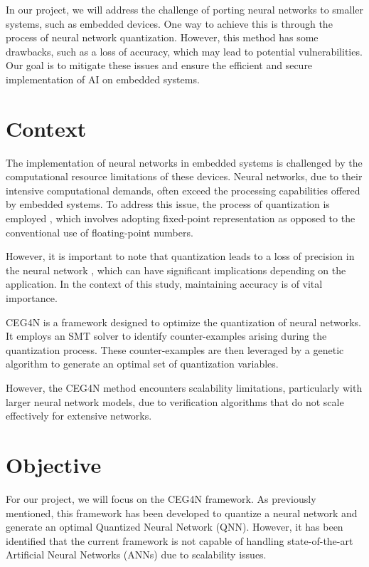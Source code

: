 \documentclass[conference]{IEEEtran}
\begin{document}
In our project, we will address the challenge of porting neural networks to smaller systems, such as embedded devices. One way to achieve this is through the process of neural network quantization. However, this method has some drawbacks, such as a loss of accuracy, which may lead to potential vulnerabilities. Our goal is to mitigate these issues and ensure the efficient and secure implementation of AI on embedded systems.

\section{Context}

The implementation of neural networks in embedded systems is challenged by the computational resource limitations of these devices. Neural networks, due to their intensive computational demands, often exceed the processing capabilities offered by embedded systems. To address this issue, the process of quantization is employed \cite{bnn_overview}, which involves adopting fixed-point representation as opposed to the conventional use of floating-point numbers.

However, it is important to note that quantization leads to a loss of precision in the neural network \cite{c4}, which can have significant implications depending on the application. In the context of this study, maintaining accuracy is of vital importance.

CEG4N \cite{1} is a framework designed to optimize the quantization of neural networks. It employs an SMT solver to identify counter-examples arising during the quantization process. These counter-examples are then leveraged by a genetic algorithm to generate an optimal set of quantization variables.

However, the CEG4N method encounters scalability limitations, particularly with larger neural network models, due to verification algorithms that do not scale effectively for extensive networks.

\section{Objective}
For our project, we will focus on the CEG4N framework. As previously mentioned, this framework has been developed to quantize a neural network and generate an optimal Quantized Neural Network (QNN). However, it has been identified that the current framework is not capable of handling state-of-the-art Artificial Neural Networks (ANNs) due to scalability issues.
\end{document}
